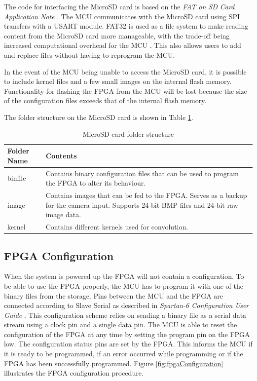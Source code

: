 The code for interfacing the MicroSD card is based on the \textit{FAT on SD Card Application Note} \cite{an0030}. The MCU communicates with the MicroSD card using SPI transfers with a USART module. FAT32 is used as a file system to make reading content from the MicroSD card more manageable, with the trade-off being increased computational overhead for the MCU \cite{msfat}. This also allows users to add and replace files without having to reprogram the MCU.

In the event of the MCU being unable to access the MicroSD card, it is possible to include kernel files and a few small images on the internal flash memory. Functionality for flashing the FPGA from the MCU will be lost because the size of the configuration files exceeds that of the internal flash memory.

The folder structure on the MicroSD card is shown in Table \ref{microsd_folder}.

\begin{table}[h!]
\centering
	\begin{tabular}{ l p{10cm} }
		
		Folder Name & Contents \\ \hline
		binfile & Contains binary configuration files that can be used to program the FPGA to alter its behaviour. \\ \hline
		image & Contains images that can be fed to the FPGA. Serves as a backup for the camera input. Supports 24-bit BMP files and 24-bit raw image data. \\ \hline
		kernel & Contains different kernels used for convolution.
	\end{tabular}
	\caption{MicroSD card folder structure}
	\label{microsd_folder}
\end{table}


\subsection{FPGA Configuration}
When the system is powered up the FPGA will not contain a configuration. To be able to use the FPGA properly, the MCU has to program it with one of the binary files from the storage. Pins between the MCU and the FPGA are connected according to Slave Serial as described in \textit{Spartan-6 Configuration User Guide} \cite[Page 28]{ug380}. This configuration scheme relies on sending a binary file as a serial data stream using a clock pin and a single data pin. The MCU is able to reset the configuration of the FPGA at any time by setting the program pin on the FPGA low. The configuration status pins are set by the FPGA. This informs the MCU if it is ready to be programmed, if an error occurred while programming or if the FPGA has been successfully programmed. Figure \ref{fig:fpgaConfiguration} illustrates the FPGA configuration procedure. 


